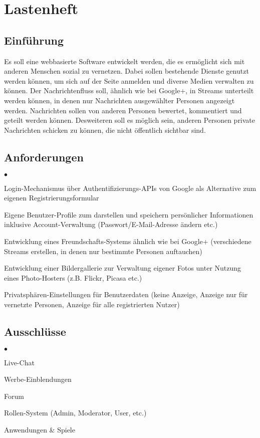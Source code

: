 \documentclass[10pt,a4paper]{article}
\begin{document}
\pagestyle{scrheadings}
\vspace*{0.1cm}
\section*{Lastenheft}

\subsection*{Einführung}
Es soll eine webbasierte Software entwickelt werden, die es ermöglicht sich mit anderen Menschen sozial zu vernetzen. Dabei sollen bestehende Dienste genutzt werden können, um sich auf der Seite anmelden und diverse Medien verwalten zu können.
Der Nachrichtenfluss soll, ähnlich wie bei Google+, in Streams unterteilt werden können, in denen nur Nachrichten ausgewählter Personen angezeigt werden.
Nachrichten sollen von anderen Personen bewertet, kommentiert und geteilt werden können.
Desweiteren soll es möglich sein, anderen Personen private Nachrichten schicken zu können, die nicht öffentlich sichtbar sind.

\subsection*{Anforderungen}
\begin{list}{$\bullet$}{}
\item Login-Mechanismus über Authentifizierungs-APIs von Google als Alternative zum eigenen Registrierungsformular
\item Eigene Benutzer-Profile zum darstellen und speichern persönlicher Informationen inklusive Account-Verwaltung (Passwort/E-Mail-Adresse ändern etc.)
\item Entwicklung eines Freundschafts-Systems ähnlich wie bei Google+ (verschiedene Streams erstellen, in denen nur bestimmte Personen auftauchen)
\item Entwicklung einer Bildergallerie zur Verwaltung eigener Fotos unter Nutzung eines Photo-Hosters (z.B. Flickr, Picasa etc.)
\item Privatsphären-Einstellungen für Benutzerdaten (keine Anzeige, Anzeige nur für vernetzte Personen, Anzeige für alle registrierten Nutzer)
\end{list}
\subsection*{Ausschlüsse}
\begin{list}{$\bullet$}{}
\item Live-Chat
\item Werbe-Einblendungen
\item Forum
\item Rollen-System (Admin, Moderator, User, etc.)
\item Anwendungen \& Spiele
\end{list}
\end{document}
